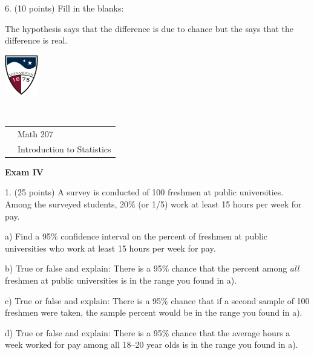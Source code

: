 \documentclass[10pt]{article}
\begin{document}
6. (10 points)  
Fill in the blanks: 
\bigskip

The \underline{\hspace{60pt}} hypothesis says that the difference is due to chance
but the \underline{\hspace{60pt}} says that the difference is real.  
\vfill
\eject

\href{http://www.su.edu}{\includegraphics[height=1.75cm]{sulogo.eps}}
\vspace{-1.69cm}

{{\ }\hfill\small
\begin{tabular}{cl}
& Math 207\\
& Introduction to Statistics\\
\end{tabular}
}
\begin{center}
\textbf{\large  Exam IV}
\end{center}
\medskip

1. (25 points) A survey is conducted of 100 freshmen at public universities.
Among the surveyed  students, 20\% (or 1/5) work at least 15 hours per week for pay.

\hspace{20pt} a) Find a 95\% confidence interval
on the  percent of freshmen at public universities who work at least 15 hours per week for pay.
\vspace{2.3in}

\hspace{20pt} b) True or false and explain:  There is a 95\% chance that the
percent among \textit{all} freshmen at public universities is in the range you found in a).
\vspace{1.5in}

\hspace{20pt} c) True or false and explain:  There is a 95\% chance that
if a second sample of 100 freshmen were taken,
the sample percent would be in the range you found in a).
\vspace{1.5in}

\hspace{20pt} d) True or false and explain:  There is a 95\% chance that the
average hours a week worked for pay among all 18--20 year olds
is in the range you found in a).
\vspace{1in}
\vfill
\eject
{\ }
\end{document}
